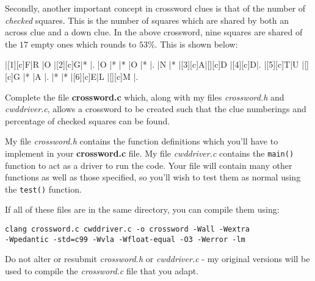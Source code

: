 \noindent Secondly, another important concept in crossword clues is that of the number of {\em checked} squares.
This is the number of squares which are shared by both an across clue and a down clue. In the above crossword, nine squares
are shared of the $17$ empty ones which rounds to $53\%$. This is shown below:

\begin{Puzzle}{5}{5}%
|[1][c]F|R |O  |[2][c]G|* |.
|O |* |* |O |* |.
|N |* |[3][c]A|[][c]D |[4][c]D|.
|[5][c]T|U |[][c]G |* |A |.
|* |* |[6][c]E|L |[][c]M |.
\end{Puzzle}

\begin{exercise}
Complete the file {\bf crossword.c} which, along with my files {\em crossword.h} and {\em cwddriver.c},
allows a crossword to be created such that the clue numberings and percentage of checked squares
can be found. 

\noindent My file {\em crossword.h} contains the function definitions which you'll have to implement
in your {\bf crossword.c} file.
My file {\em cwddriver.c} contains the \verb^main()^ function to act as a driver to run the code.
Your file will contain many other functions as well as those specified, so you'll wish to test them
as normal using the \verb^test()^ function.

\noindent If all of these files are in the same directory, you can compile them using:
\begin{verbatim}
clang crossword.c cwddriver.c -o crossword -Wall -Wextra
-Wpedantic -std=c99 -Wvla -Wfloat-equal -O3 -Werror -lm
\end{verbatim}

\noindent Do not alter or resubmit {\em crossword.h} or {\em cwddriver.c} - my original versions will be used to compile the 
{\em crossword.c} file that you adapt.
\end{exercise}
